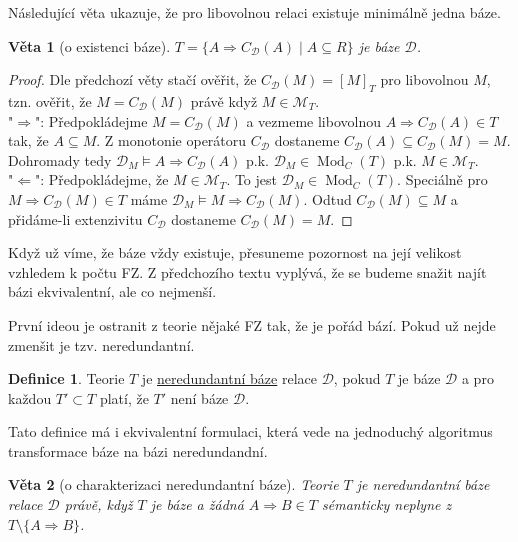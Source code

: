 \documentclass{article}
\newtheorem{theorem}{Věta}
\theoremstyle {definition}
\newtheorem{definition}{Definice}
\DeclareMathOperator{\Mod}{Mod}
\begin{document}
Následující věta ukazuje, že pro libovolnou relaci existuje minimálně
jedna báze.

\begin{theorem}[o existenci báze]
  $T = \{A \Rightarrow C_{\mathcal{D}}(A) \mid A \subseteq R\}$ je
  báze $\mathcal{D}$.
\end{theorem}

\begin{proof}
  Dle předchozí věty stačí ověřit, že $C_{\mathcal{D}}(M) = [M]_T$ pro
  libovolnou $M$, tzn. ověřit, že $M = C_{\mathcal{D}}(M)$ právě když
  $M \in \mathcal{M}_T$.\\

  "$\Rightarrow$": Předpokládejme $M = C_{\mathcal{D}}(M)$ a vezmeme
  libovolnou $A \Rightarrow C_{\mathcal{D}}(A) \in T$ tak, že $A
  \subseteq M$. Z monotonie operátoru $C_{\mathcal{D}}$ dostaneme
  $C_{\mathcal{D}}(A) \subseteq C_{\mathcal{D}}(M) = M$. Dohromady
  tedy $\mathcal{D}_M \models A \Rightarrow C_{\mathcal{D}}(A)$
  p.k. $\mathcal{D}_M \in \Mod_C(T)$ p.k. $M \in \mathcal{M}_T$.\\

  "$\Leftarrow$": Předpokládejme, že $M \in \mathcal{M}_T$. To jest
  $\mathcal{D}_M \in \Mod_C(T)$. Speciálně pro $M \Rightarrow
  C_{\mathcal{D}}(M) \in T$ máme $\mathcal{D}_M \models M \Rightarrow
  C_{\mathcal{D}}(M)$. Odtud $C_{\mathcal{D}}(M) \subseteq M$ a
  přidáme-li extenzivitu $C_{\mathcal{D}}$ dostaneme
  $C_{\mathcal{D}}(M) = M$.
\end{proof}

Když už víme, že báze vždy existuje, přesuneme pozornost na její
velikost vzhledem k počtu FZ. Z předchozího textu vyplývá, že se
budeme snažit najít bázi ekvivalentní, ale co nejmenší.

První ideou je ostranit z teorie nějaké FZ tak, že je pořád
bází. Pokud už nejde zmenšit je tzv. neredundantní.

\begin{definition}
  Teorie $T$ je \underline{neredundantní báze} relace $\mathcal{D}$,
  pokud $T$ je báze $\mathcal{D}$ a pro každou $T' \subset T$ platí,
  že $T'$ není báze $\mathcal{D}$.
\end{definition}

Tato definice má i ekvivalentní formulaci, která vede na jednoduchý
algoritmus transformace báze na bázi neredundandní.

\begin{theorem}[o charakterizaci neredundantní báze]
  Teorie $T$ je neredundantní báze relace $\mathcal{D}$ právě, když
  $T$ je báze a žádná $A \Rightarrow B \in T$ sémanticky neplyne z
  $T \setminus \{A \Rightarrow B \}$.
\end{theorem}
\end{document}
